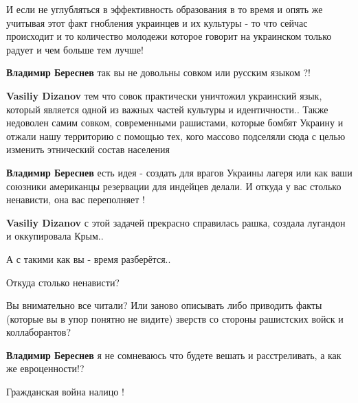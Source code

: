 \begin{itemize}
\begin{itemize}
И если не углубляться в эффективность образования в то время и опять же
учитывая этот факт гнобления украинцев и их культуры - то что сейчас происходит
и то количество молодежи которое говорит на украинском только радует и чем
больше тем лучше!


\textbf{Владимир Береснев} так вы не довольны совком или русским языком ?!


\textbf{Vasiliy Dizanov} тем что совок практически уничтожил украинский язык,
который является одной из важных частей культуры и идентичности..
Также недоволен самим совком, современными рашистами, которые бомбят Украину и
отжали нашу территорию с помощью тех, кого массово подселяли сюда с целью
изменить этнический состав населения


\textbf{Владимир Береснев} есть идея - создать для врагов Украины лагеря или
как ваши союзники американцы резервации для индейцев делали. И откуда у вас
столько ненависти, она вас переполняет !



\textbf{Vasiliy Dizanov} с этой задачей прекрасно справилась рашка, создала
лугандон и оккупировала Крым..

А с такими как вы - время разберётся..

Откуда столько ненависти?

Вы внимательно все читали? Или заново описывать либо приводить факты (которые
вы в упор понятно не видите) зверств со стороны рашистских войск и
коллаборантов?



\textbf{Владимир Береснев} я не сомневаюсь что будете вешать и расстреливать, а
как же евроценности!?


Гражданская война налицо !



\end{itemize}
\end{itemize}
